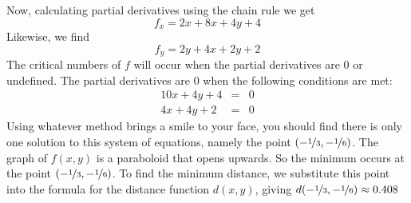 \documentclass{article}
\begin{document}
\begin{enumerate}
    Now, calculating partial derivatives using the chain rule we get 
    \[f_x =2x+8x+4y+4 \]
    Likewise, we find
    \[f_y =2y+4x+2y+2  \]
    The critical numbers of $f$ will occur when the partial derivatives are 0 or undefined. The partial derivatives are 0 when the following conditions are met:
    \begin{eqnarray*}
       10x+4y+4 &=& 0\\[1em]
    4x+4y+2  &=& 0 
    \end{eqnarray*}
    Using whatever method brings a smile to your face, you should find there is only one solution to this system of equations, namely the point $\left(-\nicefrac{1}{3},-\nicefrac{1}{6}\right)$.  The graph of $f(x,y)$ is a paraboloid that opens upwards. So the minimum occurs at the point $\left(-\nicefrac{1}{3},-\nicefrac{1}{6}\right)$. To find the minimum distance, we substitute this point into the formula for the distance function $d(x,y)$, giving
    $d(-\nicefrac{1}{3},-\nicefrac{1}{6}) \approx 0.408$
    
    \end{enumerate}
\end{document}
